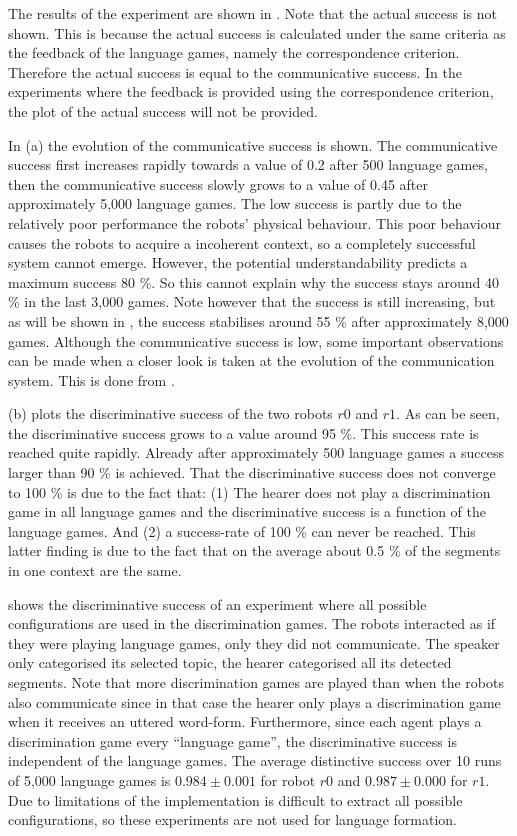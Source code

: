 The results of the experiment are shown in . Note that the actual success is not shown. This is because the actual success is calculated under the same criteria as the feedback of the language games, namely the correspondence criterion. Therefore the actual success is equal to the communicative success. In the experiments where the feedback is provided using the correspondence criterion, the plot of the actual success will not be provided.

In  (a) the evolution of the communicative success is shown. The communicative success first increases rapidly towards a value of 0.2 after 500 language games, then the communicative success slowly grows to a value of 0.45 after approximately 5,000 language games. The low success is partly due to the relatively poor performance the robots' physical behaviour. This poor behaviour causes the robots to acquire a incoherent context, so a completely successful system cannot emerge. However, the potential understandability predicts a maximum success 80 \%. So this cannot explain why the success stays around 40 \% in the last 3,000 games. Note however that the success is still increasing, but as will be shown in , the success stabilises around 55 \% after approximately 8,000 games. Although the communicative success is low, some important observations can be made when a closer look is taken at the evolution of the communication system. This is done from .

 (b) plots the discriminative success of the two robots $r0$ and $r1$. As can be seen, the discriminative success grows to a value around 95 \%. This success rate is reached quite rapidly. Already after approximately 500 language games a success larger than 90 \% is achieved. That the discriminative success does not converge to 100 \% is due to the fact that: (1) The hearer does not play a discrimination game in all language games and the discriminative success is a function of the language games. And (2) a success-rate of 100 \% can never be reached. This latter finding is due to the fact that on the average about 0.5 \% of the segments in one context are the same. 

 shows the discriminative success of an experiment where all possible configurations are used in the discrimination games. The robots interacted as if they were playing language games, only they did not communicate. The speaker only categorised its selected topic, the hearer categorised all its detected segments. Note that more discrimination games are played than when the robots also communicate since in that case the hearer only plays a discrimination game when it receives an uttered word-form. Furthermore, since each agent plays a discrimination game every ``language game'', the discriminative success is independent of the language games. The average distinctive success over 10 runs of 5,000 language games is $0.984 \pm 0.001$ for robot $r0$ and $0.987 \pm 0.000$ for $r1$. Due to limitations of the implementation is difficult to extract all possible configurations, so these experiments are not used for language formation.

